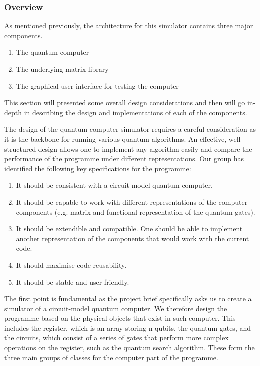 \documentclass[bibliography=totocnumbered, 10pt]{article}
\theoremstyle{NoticeStyle}
\begin{document}
%
\subsubsection{Overview}
As mentioned previously, the architecture for this simulator contains three major components.
\begin{enumerate}
	\item The quantum computer
	\item The underlying matrix library
	\item The graphical user interface for testing the computer
\end{enumerate}
This section will presented some overall design considerations and then will go in-depth in describing the design and implementations of each of the components.

The design of the quantum computer simulator requires a careful consideration as it is the backbone for running various quantum algorithms. An effective, well-structured design allows one to implement any algorithm easily and compare the performance of the programme under different representations. Our group has identified the following key specifications for the programme:
\begin{enumerate}
	\item It should be consistent with a circuit-model quantum computer. 
	\item It should be capable to work with different representations of the computer components (e.g. matrix and functional representation of the quantum gates).
	\item It should be extendible and compatible. One should be able to implement another representation of the components that would work with the current code.
	\item It should maximise code reusability.
	\item It should be stable and user friendly.
\end{enumerate}
The first point is fundamental as the project brief specifically asks us to create a simulator of a circuit-model quantum computer. We therefore design the programme based on the physical objects that exist in such computer. This includes the register, which is an array storing n qubits, the quantum gates, and the circuits, which consist of a series of gates that perform more complex operations on the register, such as the quantum search algorithm. These form the three main groups of classes for the computer part of the programme. 
\end{document}
